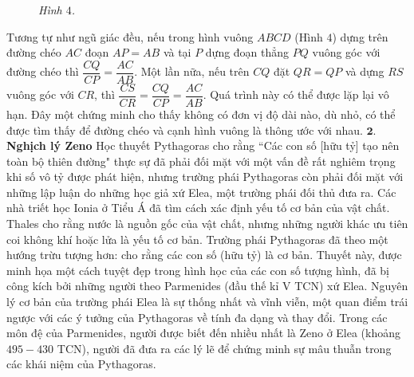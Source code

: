 \begin{multicols}{2}
\begin{figure}[H]
		\caption{\small\textit{\color{lichsutoanhoc}Hình $4$.}}
		\vspace*{-5pt}
	\end{figure}
	Tương tự như ngũ giác đều, nếu trong hình vuông $ABCD$ (Hình $4$) dựng trên đường chéo $AC$ đoạn $AP = AB$  và tại $P$ dựng đoạn thẳng $PQ$  vuông góc với đường chéo thì $\dfrac{CQ}{CP} = \dfrac{AC}{AB}$. Một lần nữa, nếu trên $CQ$  đặt $QR = QP$ và  dựng $RS$  vuông góc với $CR$,  thì  $\dfrac{CS}{CR} = \dfrac{CQ}{CP} = \dfrac{AC}{AB}$. Quá trình này có thể được lặp lại vô hạn. Đây một chứng minh cho thấy không có đơn vị độ dài nào, dù nhỏ, có thể được tìm thấy để đường chéo và cạnh hình vuông là thông ước với nhau.
	\vskip 0.1cm
	\vskip 0.1cm
	$\pmb{2.}$ \textbf{\color{lichsutoanhoc}Nghịch lý Zeno}
	\vskip 0.1cm
	Học thuyết Pythagoras cho rằng ``Các con số [hữu tỷ] tạo nên toàn bộ thiên đường" thực sự đã phải đối mặt với một vấn đề rất nghiêm trọng khi số vô tỷ được phát hiện, nhưng trường phái Pythagoras còn phải đối mặt với những lập luận do những học giả xứ Elea, một trường phái đối thủ đưa ra. 
	\vskip 0.1cm
	Các nhà triết học Ionia ở Tiểu Á đã tìm cách xác định yếu tố cơ bản của vật chất.
	\vskip 0.1cm
	Thales cho rằng nước là nguồn gốc của vật chất, nhưng những người khác ưu tiên coi không khí hoặc lửa là yếu tố cơ bản. Trường phái Pythagoras đã theo một hướng trừu tượng hơn: cho rằng các con số (hữu tỷ) là cơ bản. Thuyết này, được minh họa một cách tuyệt đẹp trong hình học của các con số tượng hình, đã bị công kích bởi những người theo Parmenides (đầu thế kỉ V TCN) xứ Elea. Nguyên lý cơ bản của trường phái Elea là sự thống nhất và vĩnh viễn, một quan điểm trái ngược với các ý tưởng của Pythagoras về tính đa dạng và thay đổi.  Trong các môn đệ của Parmenides, người được biết đến nhiều nhất là Zeno ở Elea (khoảng $495-430$ TCN), người đã đưa ra các lý lẽ để chứng minh sự mâu thuẫn trong các khái niệm của Pythagoras.

\end{multicols}
